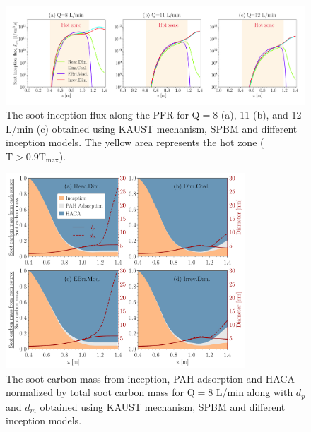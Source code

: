 \begin{figure}[H]
	\centering
	\includegraphics[width=1\textwidth]{Figures/Results/PFR/inception.pdf}
	\caption{The soot inception flux along the PFR for $\mathrm{Q}=8$ (a), 11 (b), and 12 L/min (c) obtained using KAUST mechanism, SPBM and different inception models. The yellow area represents the hot zone ($\mathrm{T}>0.9\mathrm{T_{max}}$).}
	\label{fig:pfr_Iinc} 
\end{figure}


\begin{figure}[H]
	\centering
	\includegraphics[width=0.8\textwidth]{Figures/Results/PFR/C_tot_distmap.pdf}
	\caption{The soot carbon mass from inception, PAH adsorption and HACA normalized by total soot carbon mass for $\mathrm{Q}=8$ L/min along with $d_p$ and $d_m$ obtained using KAUST mechanism, SPBM and different inception models.}
	\label{fig:pfr_cmap} 
\end{figure}